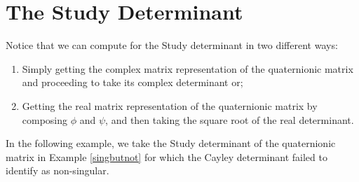 \section{The Study Determinant}


Notice that we can compute for the Study determinant in two different ways: 
\begin{enumerate}
	\item Simply getting the complex matrix representation of the quaternionic matrix and proceeding to take its complex determinant or;
	\item Getting the real matrix representation of the quaternionic matrix by composing $\phi$ and $\psi$, and then taking the square root of the real determinant.
\end{enumerate}

In the following example, we take the Study determinant of the quaternionic matrix in Example \ref{singbutnot} for which the Cayley determinant failed to identify as non-singular. 

